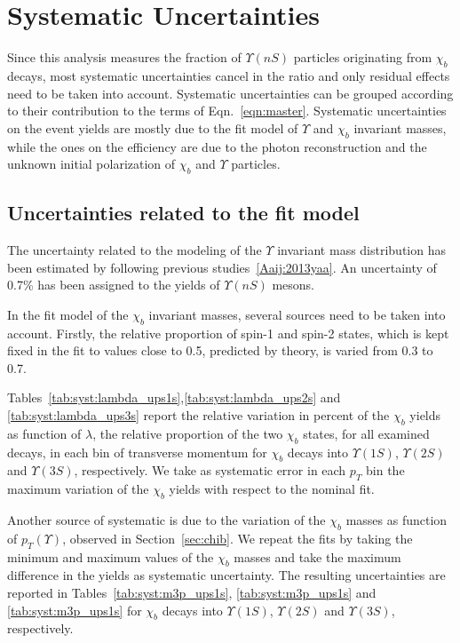 \section{Systematic Uncertainties}
\label{sec:syst}

Since this analysis measures the fraction of $\Upsilon(nS)$ particles
originating from $\chi_b$ decays, most systematic uncertainties cancel in the
ratio and only residual effects need to be taken into account. Systematic
uncertainties can be grouped according to their contribution to the terms of
Eqn.~\ref{eqn:master}. Systematic uncertainties on the event yields are mostly
due to the fit model of $\Upsilon$ and $\chi_b$ invariant masses, while the
ones on the efficiency are due to the photon reconstruction and the unknown
initial polarization of $\chi_b$ and $\Upsilon$ particles.
 

\subsection{Uncertainties related to the fit model}

The uncertainty related to the modeling of the $\Upsilon$ invariant mass
distribution has been estimated by following previous
studies~\ref{Aaij:2013yaa}. An uncertainty of 0.7\% has been assigned to the
yields of $\Upsilon(nS)$ mesons.

In the fit model of the $\chi_b$ invariant masses, several sources need to be
taken into account. Firstly, the relative proportion of spin-1 and spin-2
states, which is kept fixed in the fit to values close to 0.5, predicted by
theory, is varied from 0.3 to 0.7.


Tables~\ref{tab:syst:lambda_ups1s},\ref{tab:syst:lambda_ups2s} and
\ref{tab:syst:lambda_ups3s} report the relative variation in percent of the
$\chi_b$ yields as function of $\lambda$, the relative proportion of the two
$\chi_b$ states, for all examined decays, in each bin of transverse momentum
for $\chi_b$ decays into $\Upsilon(1S)$, $\Upsilon(2S)$ and $\Upsilon(3S)$,
respectively. We take as systematic error in each $p_T$ bin the maximum
variation of the $\chi_b$ yields with respect to the nominal fit.

Another source of systematic is due to the variation of the $\chi_b$ masses as
function of $p_T(\Upsilon)$, observed in Section~\ref{sec:chib}. We repeat the
fits by taking the minimum and maximum values of the $\chi_b$ masses and take
the maximum difference in the yields as systematic uncertainty. The resulting
uncertainties are reported in Tables~\ref{tab:syst:m3p_ups1s},
\ref{tab:syst:m3p_ups1s} and \ref{tab:syst:m3p_ups1s} for $\chi_b$ decays into
$\Upsilon(1S)$, $\Upsilon(2S)$ and $\Upsilon(3S)$, respectively.
 
